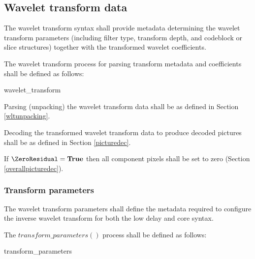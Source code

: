 \subsection{Wavelet transform data}
\label{wavelettransform}

The wavelet transform syntax shall provide metadata determining the wavelet transform
 parameters (including filter type, transform depth, and codeblock or slice structures) together with the transformed wavelet coefficients. 

The wavelet transform process for parsing transform metadata and coefficients shall be defined as follows:

\begin{pseudo}{wavelet\_transform}{}
\bsCODE{\ZeroResidual = \false}
\bsEND
\bsIF{\ZeroResidual == \false}
\bsEND
\end{pseudo}

Parsing (unpacking) the wavelet transform data shall be as defined in Section \ref{wltunpacking}. 

Decoding the transformed wavelet transform data to produce decoded pictures shall be
 as defined in Section \ref{picturedec}.

If $\ZeroResidual=\true$ then all component pixels shall be 
set to zero (Section \ref{overallpicturedec}).

\subsubsection{Transform parameters}
\label{transformparameters}

The wavelet transform parameters shall define the metadata required to configure the inverse wavelet transform for both the low delay and core syntax. 

The $transform\_parameters()$ process shall be defined as follows:

\begin{pseudo}{transform\_parameters}{}
\bsELSE
\bsEND
\end{pseudo}

